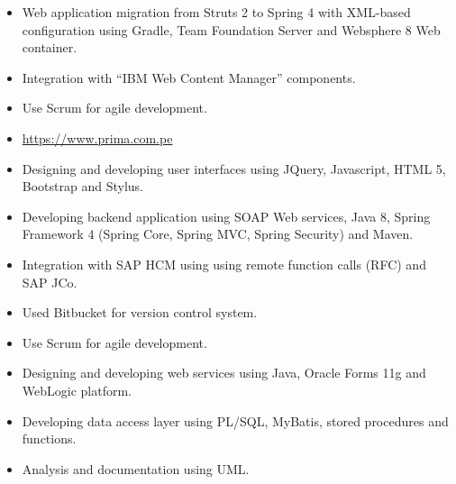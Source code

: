 \documentclass[10pt,a4paper,ragged2e]{altacv}
\begin{document}
\vspace{10px}

\begin{itemize}
   \item Web application migration from Struts 2 to Spring 4 with XML-based configuration using Gradle, Team Foundation Server and Websphere 8 Web container.
   \item Integration with “IBM Web Content Manager” components.
   \item Use Scrum for agile development.
   \item \url{https://www.prima.com.pe}
\end{itemize}

\vspace{10px}

\begin{itemize}
   \item Designing and developing user interfaces using JQuery, Javascript, HTML 5, Bootstrap and Stylus.
   \item Developing backend application using SOAP Web services, Java 8, Spring Framework 4 (Spring Core, Spring MVC, Spring Security) and Maven.
   \item Integration with SAP HCM using using remote function calls (RFC) and SAP JCo.
   \item Used Bitbucket for version control system.
   \item Use Scrum for agile development.
\end{itemize}

\vspace{10px}

\begin{itemize}
   \item Designing and developing web services using Java, Oracle Forms 11g and WebLogic platform.
   \item Developing data access layer using  PL/SQL, MyBatis, stored procedures and functions.
   \item Analysis and documentation using UML.
\end{itemize}
\end{document}
